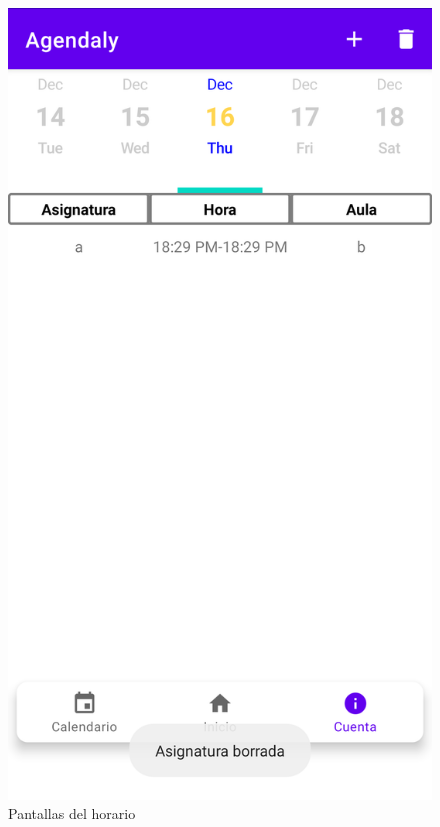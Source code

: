 \documentclass[a4paper,openright,12pt]{article}
\begin{document}
\begin{figure}
            \includegraphics[scale=0.05]{asignaturaBorrToast.png}
            \caption{Pantallas del horario}
        \end{figure}
        
\end{document}
